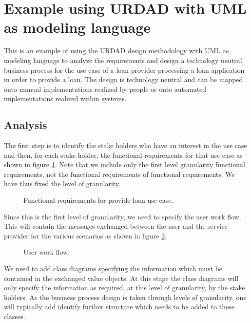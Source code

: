 \section{Example using URDAD with UML as modeling language}

This is an example of using the URDAD design methodology with UML as modeling
language to analyze the requirements and design a technology neutral business
process for the use case of a loan provider processing a loan application in order
to provide a loan. The design is technology neutral and can be mapped onto manual
implementations realized by people or onto automated implementations realized
within systems.


\subsection{Analysis}

The first step is to identify the stake holders who have an interest in the use
case and then, for each stake holder, the functional requirements for that use case
as shown in figure \ref{fig:provideLoanFunctionalRequirements}. Note that we include
only the first level granularity functional requirements, not the functional requirements
of functional requirements. We have thus fixed the level of granularity.

\begin{figure}
  \centering
  \caption{Functional requirements for provide loan use case.}
  \label{fig:provideLoanFunctionalRequirements}
\end{figure}

Since this is the first level of granularity, we need to specify the user work
flow. This will contain the messages exchanged between the user and the
service provider for the various scenarios as shown in figure
\ref{fig:provideLoanUserWorkflow}.

\begin{figure}
  \centering
  \caption{User work flow.}
  \label{fig:provideLoanUserWorkflow}
\end{figure}

We need to add class diagrams specifying the information which must be
contained in the exchanged value objects. At this stage the class diagrams
will only specify the information as required, at this level of granularity,
 by the stake holders. As the
business process design is taken through levels of granularity, one will
typically add identify further structure which needs to be added to these classes.

